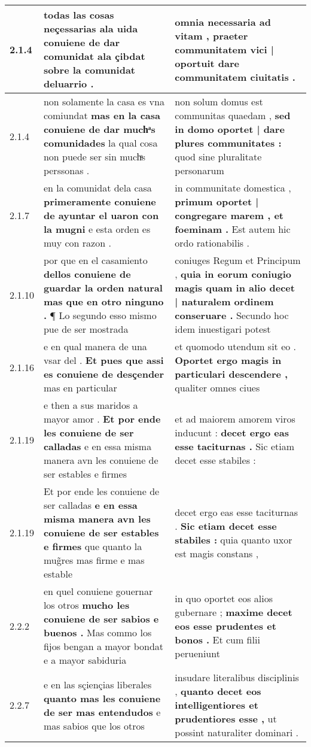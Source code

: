 \begin{tabular}{|p{1cm}|p{6.5cm}|p{6.5cm}|}
2.1.4 & todas las cosas neçessarias ala uida \textbf{ conuiene de dar comunidat ala çibdat } sobre la comunidat deluarrio . & omnia necessaria ad vitam , \textbf{ praeter communitatem vici | oportuit } dare communitatem ciuitatis . \\\hline
2.1.4 & non solamente la casa es vna comiundat \textbf{ mas en la casa conuiene de dar muchͣs comunidades } la qual cosa non puede ser sin muchͣs perssonas . & non solum domus est communitas quaedam , \textbf{ sed in domo oportet | dare plures communitates : } quod sine pluralitate personarum \\\hline
2.1.7 & en la comunidat dela casa \textbf{ primeramente conuiene de ayuntar el uaron con la mugni } e esta orden es muy con razon . & in communitate domestica , \textbf{ primum oportet | congregare marem , et foeminam . } Est autem hic ordo rationabilis . \\\hline
2.1.10 & por que en el casamiento \textbf{ dellos conuiene de guardar la orden natural mas que en otro ninguno . } ¶ Lo segundo esso mismo pue de ser mostrada & coniuges Regum et Principum , \textbf{ quia in eorum coniugio magis quam in alio decet | naturalem ordinem conseruare . } Secundo hoc idem inuestigari potest \\\hline
2.1.16 & e en qual manera de una vsar del . \textbf{ Et pues que assi es conuiene de desçender } mas en particular & et quomodo utendum sit eo . \textbf{ Oportet ergo magis in particulari descendere , } qualiter omnes ciues \\\hline
2.1.19 & e then a sus maridos a mayor amor . \textbf{ Et por ende les conuiene de ser calladas } e en essa misma manera avn les conuiene de ser estables e firmes & et ad maiorem amorem viros inducunt : \textbf{ decet ergo eas esse taciturnas . } Sic etiam decet esse stabiles : \\\hline
2.1.19 & Et por ende les conuiene de ser calladas \textbf{ e en essa misma manera avn les conuiene de ser estables e firmes } que quanto la mug̃res mas firme e mas estable & decet ergo eas esse taciturnas . \textbf{ Sic etiam decet esse stabiles : } quia quanto uxor est magis constans , \\\hline
2.2.2 & en quel conuiene gouernar los otros \textbf{ mucho les conuiene de ser sabios e buenos . } Mas commo los fijos bengan a mayor bondat e a mayor sabiduria & in quo oportet eos alios gubernare ; \textbf{ maxime decet eos esse prudentes et bonos . } Et cum filii perueniunt \\\hline
2.2.7 & e en las sçiençias liberales \textbf{ quanto mas les conuiene de ser mas entendudos } e mas sabios que los otros & insudare literalibus disciplinis , \textbf{ quanto decet eos intelligentiores et prudentiores esse , } ut possint naturaliter dominari . \\\hline

\end{tabular}
